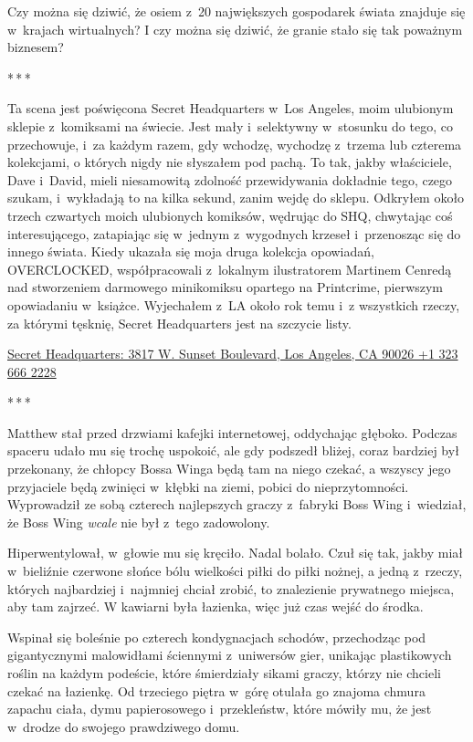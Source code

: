\documentclass[oneside,polish,11pt,rmheadings]{mwbk}
\newcommand{\threeast}{\par\centerline{*\,*\,*}\medskip\par}
\begin{document}
Czy można się dziwić, że osiem z~20 największych gospodarek świata znajduje się w~krajach wirtualnych? I czy można się dziwić, że granie stało się tak poważnym biznesem? 


\bigskip
\threeast

Ta scena jest poświęcona Secret Headquarters w~Los Angeles, moim ulubionym sklepie z~komiksami na świecie. Jest mały i~selektywny w~stosunku do tego, co przechowuje, i~za każdym razem, gdy wchodzę, wychodzę z~trzema lub czterema kolekcjami, o których nigdy nie słyszałem pod pachą. To tak, jakby właściciele, Dave i~David, mieli niesamowitą zdolność przewidywania dokładnie tego, czego szukam, i~wykładają to na kilka sekund, zanim wejdę do sklepu. Odkryłem około trzech czwartych moich ulubionych komiksów, wędrując do SHQ, chwytając coś interesującego, zatapiając się w~jednym z~wygodnych krzeseł i~przenosząc się do innego świata. Kiedy ukazała się moja druga kolekcja opowiadań, OVERCLOCKED, współpracowali z~lokalnym ilustratorem Martinem Cenredą nad stworzeniem darmowego minikomiksu opartego na Printcrime, pierwszym opowiadaniu w~książce. Wyjechałem z~LA około rok temu i~z wszystkich rzeczy, za którymi tęsknię, Secret Headquarters jest na szczycie listy. 


\href{https://www.thesecretheadquarters.com/}{Secret Headquarters: 3817 W. Sunset Boulevard, Los Angeles, CA 90026 +1 323 666 2228} 

\bigskip

\threeast

Matthew stał przed drzwiami kafejki internetowej, oddychając głęboko. Podczas spaceru udało mu się trochę uspokoić, ale gdy podszedł bliżej, coraz bardziej był przekonany, że chłopcy Bossa Winga będą tam na niego czekać, a wszyscy jego przyjaciele będą zwinięci w~kłębki na ziemi, pobici do nieprzytomności. Wyprowadził ze sobą czterech najlepszych graczy z~fabryki Boss Wing i~wiedział, że Boss Wing \textit{wcale }nie był z~tego zadowolony. 


Hiperwentylował, w~głowie mu się kręciło. Nadal bolało. Czuł się tak, jakby miał w~bieliźnie czerwone słońce bólu wielkości piłki do piłki nożnej, a jedną z~rzeczy, których najbardziej i~najmniej chciał zrobić, to znalezienie prywatnego miejsca, aby tam zajrzeć. W kawiarni była łazienka, więc już czas wejść do środka. 


Wspinał się boleśnie po czterech kondygnacjach schodów, przechodząc pod gigantycznymi malowidłami ściennymi z~uniwersów gier, unikając plastikowych roślin na każdym podeście, które śmierdziały sikami graczy, którzy nie chcieli czekać na łazienkę. Od trzeciego piętra w~górę otulała go znajoma chmura zapachu ciała, dymu papierosowego i~przekleństw, które mówiły mu, że jest w~drodze do swojego prawdziwego domu. 
\end{document}
